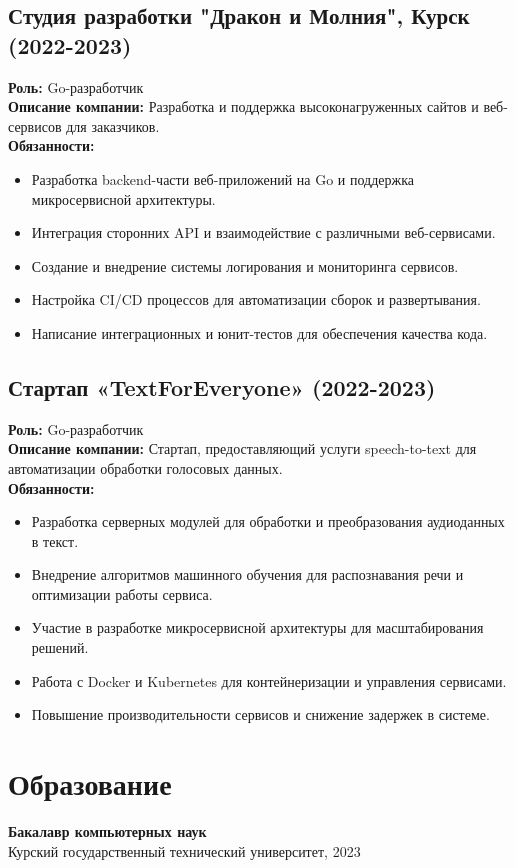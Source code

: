 \documentclass[a4paper,12pt]{article}
\begin{document}
\subsection*{Студия разработки "Дракон и Молния", Курск (2022-2023)}
\textbf{Роль:} Go-разработчик \\
\textbf{Описание компании:} Разработка и поддержка высоконагруженных сайтов и веб-сервисов для заказчиков. \\
\textbf{Обязанности:}
\begin{itemize}[noitemsep]
    \item Разработка backend-части веб-приложений на Go и поддержка микросервисной архитектуры.
    \item Интеграция сторонних API и взаимодействие с различными веб-сервисами.
    \item Создание и внедрение системы логирования и мониторинга сервисов.
    \item Настройка CI/CD процессов для автоматизации сборок и развертывания.
    \item Написание интеграционных и юнит-тестов для обеспечения качества кода.
\end{itemize}

\subsection*{Стартап «TextForEveryone» (2022-2023)}
\textbf{Роль:} Go-разработчик \\
\textbf{Описание компании:} Стартап, предоставляющий услуги speech-to-text для автоматизации обработки голосовых данных. \\
\textbf{Обязанности:}
\begin{itemize}[noitemsep]
    \item Разработка серверных модулей для обработки и преобразования аудиоданных в текст.
    \item Внедрение алгоритмов машинного обучения для распознавания речи и оптимизации работы сервиса.
    \item Участие в разработке микросервисной архитектуры для масштабирования решений.
    \item Работа с Docker и Kubernetes для контейнеризации и управления сервисами.
    \item Повышение производительности сервисов и снижение задержек в системе.
\end{itemize}

\section{Образование}
\textbf{Бакалавр компьютерных наук} \\
Курский государственный технический университет, 2023
\end{document}
